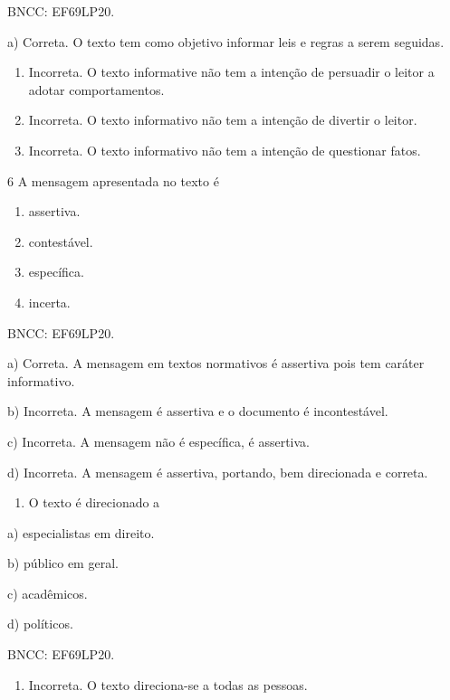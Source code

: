 {BNCC: EF69LP20.

a) Correta. O texto tem como objetivo informar leis e regras a serem
seguidas.

\begin{enumerate}
\def\labelenumi{\alph{enumi})}
\setcounter{enumi}{1}
\item
  Incorreta. O texto informative não tem a intenção de persuadir o
  leitor a adotar comportamentos.
\item
  Incorreta. O texto informativo não tem a intenção de divertir o
  leitor.
\item
  Incorreta. O texto informativo não tem a intenção de questionar fatos.
\end{enumerate}

\num{6} A mensagem apresentada no texto é

\begin{enumerate}
\def\labelenumi{\alph{enumi})}
\item
  assertiva.
\item
  contestável.
\item
  específica.
\item
  incerta.
\end{enumerate}

BNCC: EF69LP20.

a) Correta. A mensagem em textos normativos é assertiva pois tem caráter
informativo.

b) Incorreta. A mensagem é assertiva e o documento é incontestável.

c) Incorreta. A mensagem não é específica, é assertiva.

d) Incorreta. A mensagem é assertiva, portando, bem direcionada e
correta.

\begin{enumerate}
\def\labelenumi{\arabic{enumi}.}
\setcounter{enumi}{6}
\tightlist
\item
  O texto é direcionado a
\end{enumerate}

a) especialistas em direito.

b) público em geral.

c) acadêmicos.

d) políticos.

BNCC: EF69LP20.

\begin{enumerate}
\def\labelenumi{\alph{enumi})}
\tightlist
\item
  Incorreta. O texto direciona-se a todas as pessoas.
\end{enumerate}

}
